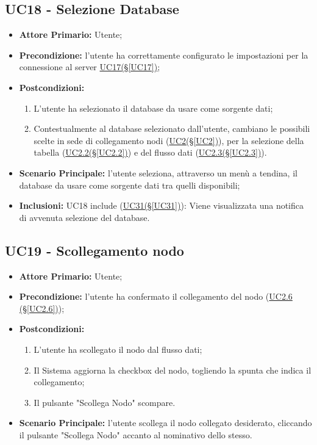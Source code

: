 \pagebreak

\subsection{UC18 - Selezione Database}\label{UC18}
\begin{itemize}
	\item \textbf{Attore Primario:} Utente;
	\item \textbf{Precondizione:} l'utente ha correttamente configurato le impostazioni per la connessione al server \hyperref[UC17]{UC17(§\ref*{UC17})};
	\item \textbf{Postcondizioni:}
	\begin{enumerate}
		\item L'utente ha selezionato il database da usare come sorgente dati;
		\item Contestualmente al database selezionato dall'utente, cambiano le possibili scelte in sede di collegamento nodi (\hyperref[UC2]{UC2(§\ref*{UC2})}), per la selezione della tabella (\hyperref[UC2.2]{UC2.2(§\ref*{UC2.2})}) e del flusso dati (\hyperref[UC2.3]{UC2.3(§\ref*{UC2.3})}).
	\end{enumerate}
	\item \textbf{Scenario Principale:} l'utente seleziona, attraverso un menù a tendina, il database da usare come sorgente dati tra quelli disponibili;
	\item \textbf{Inclusioni:} UC18 include (\hyperref[UC31]{UC31(§\ref*{UC31})}): Viene visualizzata una notifica di avvenuta selezione del database.
\end{itemize}

\pagebreak

\subsection{UC19 - Scollegamento nodo}\label{UC19}
\begin{itemize}
	\item \textbf{Attore Primario:} Utente;
	\item \textbf{Precondizione:} l'utente ha confermato il collegamento del nodo (\hyperref[UC2.6]{UC2.6 									(§\ref*{UC2.6})});
	\item \textbf{Postcondizioni:}
	\begin{enumerate}
		\item L'utente ha scollegato il nodo dal flusso dati;
		\item Il Sistema aggiorna la checkbox del nodo, togliendo la spunta che indica il collegamento;
		\item Il pulsante "Scollega Nodo" scompare.
	\end{enumerate}
	\item \textbf{Scenario Principale:} l'utente scollega il nodo collegato desiderato, cliccando il pulsante "Scollega Nodo" accanto al nominativo dello stesso.
\end{itemize}

